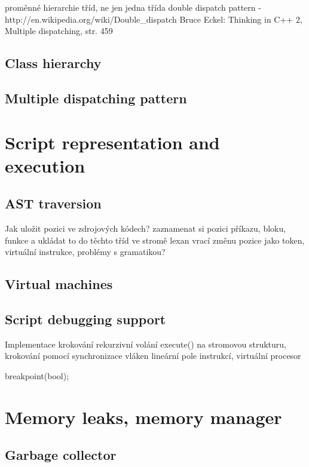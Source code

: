\documentclass[11pt,twoside,a4paper]{book}
\begin{document}
proměnné
	hierarchie tříd, ne jen jedna třída
	double dispatch pattern - http://en.wikipedia.org/wiki/Double\_dispatch
	Bruce Eckel: Thinking in C++ 2, Multiple dispatching, str. 459

\subsection{Class hierarchy}

\subsection{Multiple dispatching pattern}


\section{Script representation and execution}

\subsection{AST traversion}

Jak uložit pozici ve zdrojových kódech?
	zaznamenat si pozici příkazu, bloku, funkce a ukládat to do těchto tříd ve stromě
	lexan vrací změnu pozice jako token, virtuální instrukce, problémy s gramatikou?

\subsection{Virtual machines}

\subsection{Script debugging support}

Implementace krokování
	rekurzivní volání execute() na stromovou strukturu, krokování pomocí synchronizace vláken
	lineární pole instrukcí, virtuální procesor

breakpoint(bool);


\section{Memory leaks, memory manager}

\subsection{Garbage collector}
\end{document}
